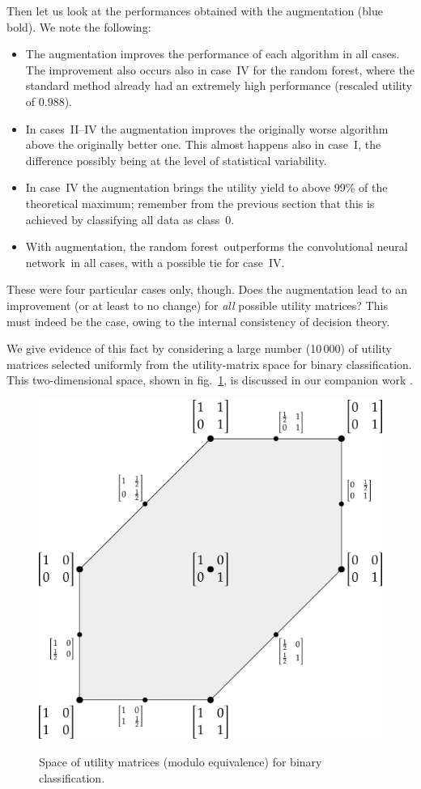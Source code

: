 \documentclass[\ifafour a4paper,12pt,\else a5paper,10pt,\fi%
onecolumn,oneside,article,%
british%
]{memoir}
\theoremstyle{remark}
\theoremstyle{innote}
\renewcommand*{\|}[1][]{\nonscript\:#1\vert\nonscript\:\mathopen{}}
\newcommand*{\sect}{\S}%
\newcommand*{\fig}{fig.}%
\newcommand*{\RF}{random forest}
\newcommand*{\CNN}{convolutional neural network}
\begin{document}
Then let us look at the performances obtained with the augmentation (blue bold). We note the following:
\begin{itemize}
\item The augmentation improves the performance of each algorithm in all cases. The improvement also occurs also in case~IV for the \RF, where the standard method already had an extremely high performance (rescaled utility of 0.988).
\item In cases~II--IV the augmentation improves the originally worse algorithm above the originally better one. This almost happens also in case~I, the difference possibly being at the level of statistical variability.
\item In case~IV the augmentation brings the utility yield to above 99\% of the theoretical maximum; remember from the previous section that this is achieved by classifying all data as class~0.
\item With augmentation, the \RF\ outperforms the \CNN\ in all cases, with a possible tie for case~IV.
\end{itemize}




\medskip

These were four particular cases only, though. Does the augmentation lead to an improvement (or at least to no change) for \emph{all} possible utility matrices? This must indeed be the case, owing to the internal consistency of decision theory.

We give evidence of this fact by considering a large number (10\,000) of utility matrices selected uniformly from the utility-matrix space for binary classification. This two-dimensional space, shown in \fig~\ref{fig:space_UM}, is discussed in our companion work \autocites[\sect~3.2]{dyrlandetal2022}.
\begin{figure}[t]
  \centering
  \includegraphics[width=0.5\linewidth]{space_UM2c.pdf}\\
  \caption{Space of utility matrices (modulo equivalence) for binary classification.}
  \label{fig:space_UM}
\end{figure}
\end{document}
